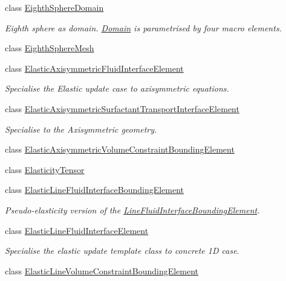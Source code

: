 \begin{DoxyCompactItemize}
class \hyperlink{classoomph_1_1EighthSphereDomain}{Eighth\+Sphere\+Domain}
\begin{DoxyCompactList}\small\item\em Eighth sphere as domain. \hyperlink{classoomph_1_1Domain}{Domain} is parametrised by four macro elements. \end{DoxyCompactList}\item 
class \hyperlink{classoomph_1_1EighthSphereMesh}{Eighth\+Sphere\+Mesh}
\item 
class \hyperlink{classoomph_1_1ElasticAxisymmetricFluidInterfaceElement}{Elastic\+Axisymmetric\+Fluid\+Interface\+Element}
\begin{DoxyCompactList}\small\item\em Specialise the Elastic update case to axisymmetric equations. \end{DoxyCompactList}\item 
class \hyperlink{classoomph_1_1ElasticAxisymmetricSurfactantTransportInterfaceElement}{Elastic\+Axisymmetric\+Surfactant\+Transport\+Interface\+Element}
\begin{DoxyCompactList}\small\item\em Specialise to the Axisymmetric geometry. \end{DoxyCompactList}\item 
class \hyperlink{classoomph_1_1ElasticAxisymmetricVolumeConstraintBoundingElement}{Elastic\+Axisymmetric\+Volume\+Constraint\+Bounding\+Element}
\item 
class \hyperlink{classoomph_1_1ElasticityTensor}{Elasticity\+Tensor}
\item 
class \hyperlink{classoomph_1_1ElasticLineFluidInterfaceBoundingElement}{Elastic\+Line\+Fluid\+Interface\+Bounding\+Element}
\begin{DoxyCompactList}\small\item\em Pseudo-\/elasticity version of the \hyperlink{classoomph_1_1LineFluidInterfaceBoundingElement}{Line\+Fluid\+Interface\+Bounding\+Element}. \end{DoxyCompactList}\item 
class \hyperlink{classoomph_1_1ElasticLineFluidInterfaceElement}{Elastic\+Line\+Fluid\+Interface\+Element}
\begin{DoxyCompactList}\small\item\em Specialise the elastic update template class to concrete 1D case. \end{DoxyCompactList}\item 
class \hyperlink{classoomph_1_1ElasticLineVolumeConstraintBoundingElement}{Elastic\+Line\+Volume\+Constraint\+Bounding\+Element}

\end{DoxyCompactItemize}
